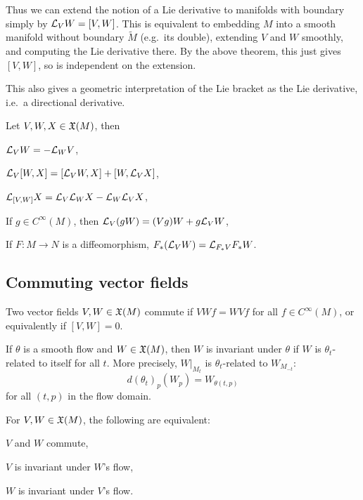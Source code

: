 \eproof

Thus we can extend the notion of a Lie derivative to manifolds with boundary simply by ${{\cal L}}_VW=[V,W]$.
This is equivalent to embedding $M$ into a smooth manifold without boundary $\tilde M$ (e.g.\ its double), extending $V$ and $W$ smoothly,
and computing the Lie derivative there.
By the above theorem, this just gives $[V,W]$, so is independent on the extension.

This also gives a geometric interpretation of the Lie bracket as the Lie derivative, i.e.\ a directional derivative.

\bcoro

    Let $V,W,X\in{\frak X}(M)$, then
    \benum
        \item ${{\cal L}}_VW=-{{\cal L}}_WV$,
        \item ${{\cal L}}_V[W,X]=[{{\cal L}}_VW,X]+[W,{{\cal L}}_VX]$,
        \item ${{\cal L}}_{[V,W]}X={{\cal L}}_V{{\cal L}}_WX-{{\cal L}}_W{{\cal L}}_VX$,
        \item If $g\in C^\infty(M)$, then ${{\cal L}}_V(gW)=(Vg)W+g{{\cal L}}_VW$,
        \item If $F\colon M\to N$ is a diffeomorphism, $F_*({{\cal L}}_VW)={{\cal L}}_{F_*V}F_*W$.
    \eenum

\ecoro

\subsection{Commuting vector fields}

\bdefn

    Two vector fields $V,W\in{\frak X}(M)$ {\emphcolor commute} if $VWf=WVf$ for all $f\in C^\infty(M)$, or equivalently if
    $[V,W]=0$.

\edefn

\bdefn

    If $\theta$ is a smooth flow and $W\in{\frak X}(M)$, then $W$ is {\emphcolor invariant under $\theta$} if $W$ is
    $\theta_t$-related to itself for all $t$.
    More precisely, $W|_{M_t}$ is $\theta_t$-related to $W_{M_{-t}}$:
    $$ d(\theta_t)_p(W_p) = W_{\theta(t,p)} $$
    for all $(t,p)$ in the flow domain.

\edefn

\bthrm

    For $V,W\in{\frak X}(M)$, the following are equivalent:
    \benum
        \item $V$ and $W$ commute,
        \item $V$ is invariant under $W$'s flow,
        \item $W$ is invariant under $V$'s flow.
    \eenum

